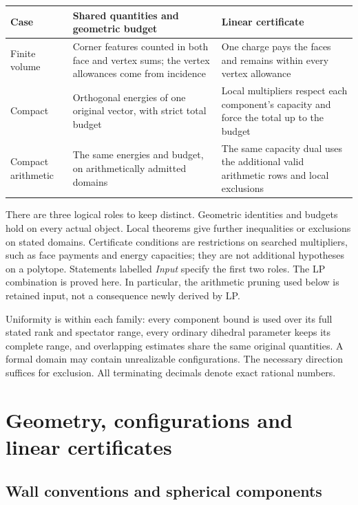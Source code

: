 \documentclass[11pt]{article}
\theoremstyle{definition}
\theoremstyle{remark}
\numberwithin{equation}{section}
\begin{document}
\begin{center}\small
\begin{tabular}{>{\raggedright\arraybackslash}p{.15\linewidth}
 >{\raggedright\arraybackslash}p{.41\linewidth}
 >{\raggedright\arraybackslash}p{.34\linewidth}}
\toprule
Case&Shared quantities and geometric budget&Linear certificate\\\midrule
Finite volume&Corner features counted in both face and vertex sums;
 the vertex allowances come from incidence&One charge pays the faces
 and remains within every vertex allowance\\
Compact&Orthogonal energies of one original vector, with strict
 total budget&Local multipliers respect each component's capacity
 and force the total up to the budget\\
Compact arithmetic&The same energies and budget, on arithmetically
 admitted domains&The same capacity dual uses the additional valid
 arithmetic rows and local exclusions\\\bottomrule
\end{tabular}
\end{center}

There are three logical roles to keep distinct. Geometric identities
and budgets hold on every actual object. Local theorems give further
inequalities or exclusions on stated domains. Certificate conditions
are restrictions on searched multipliers, such as face payments and
energy capacities; they are not additional hypotheses on a polytope.
Statements labelled \emph{Input} specify the first two roles. The LP
combination is proved here. In particular, the arithmetic pruning
used below is retained input, not a consequence newly derived by LP.

Uniformity is within each family: every component bound is used over
its full stated rank and spectator range, every ordinary dihedral
parameter keeps its complete range, and overlapping estimates share
the same original quantities. A formal domain may contain unrealizable
configurations. The necessary direction suffices for exclusion.
All terminating decimals denote exact rational numbers.

\section{Geometry, configurations and linear certificates}
\label{sec:framework}

\subsection{Wall conventions and spherical components}
\end{document}
